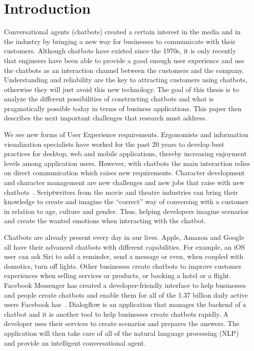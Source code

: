 
\chapter{Introduction} %

\label{Chapter1} %

Conversational agents (chatbots) created a certain interest in the media and in the industry by bringing a new way for businesses to communicate with their customers. Although chatbots have existed since the 1970s, it is only recently that engineers have been able to provide a good enough user experience and use the chatbots as an interaction channel between the customers and the company.
Understanding and reliability are the key to attracting customers using chatbots, otherwise they will just avoid this new technology.
The goal of this thesis is to analyze the different possibilities of constructing chatbots and what is pragmatically possible today in terms of business applications. This paper then describes the next important challenges that research must address.

We see new forms of User Experience requirements. Ergonomists and information visualization specialists have worked for the past 20 years to develop best practices for desktop, web and mobile applications, thereby increasing enjoyment levels among application users.
However, with chatbots the main interaction relies on direct communication which raises new requirements.
Character development and character management are new challenges and new jobs that raise with new chatbots~\citep{1704.04579}.
Scriptwriters from the movie and theatre industries can bring their knowledge to create and imagine the ``correct'' way of conversing with a customer in relation to age, culture and gender. Thus, helping developers imagine scenarios and create the wanted emotions when interacting with the chatbot.

Chatbots are already present every day in our lives. Apple, Amazon and Google all have their advanced chatbots with different capabilities. For example, an iOS user can ask Siri to add a reminder, send a message or even, when coupled with domotics, turn off lights. Other businesses create chatbots to improve customer experiences when selling services or products, or booking a hotel or a flight.
Facebook Messenger has created a developer-friendly interface to help businesses and people create chatbots and enable them for all of the 1.37 billion daily active users Facebook has~\citep{facebook3rdquarter2017}. Dialogflow is an application that manages the backend of a chatbot and it is another tool to help businesses create chatbots rapidly.
A developer uses their services to create scenarios and prepares the answers. The application will then take care of all of the natural language processing (NLP) and provide an intelligent conversational agent.

